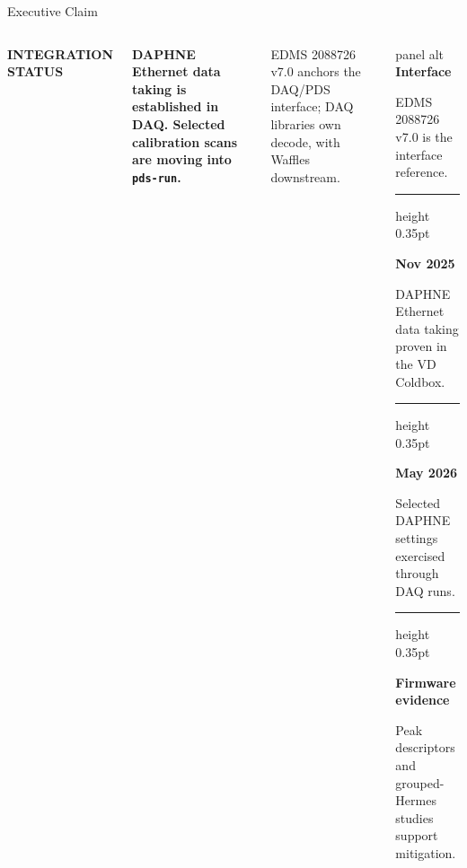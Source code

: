\documentclass[aspectratio=169,10pt]{beamer}
\newcommand{\eyebrow}[1]{{\color{noircyan}\small\bfseries #1\par}}
\newcommand{\blocksep}{%
  \vspace{0.7mm}%
  {\color{noirline}\hrule height 0.35pt}%
  \vspace{0.7mm}%
}
\begin{document}
\begin{frame}[t]{Executive Claim}
\begin{columns}[T,onlytextwidth]
\eyebrow{INTEGRATION STATUS}
{\color{white}\bfseries\fontsize{14}{17}\selectfont
DAPHNE Ethernet data taking is established in DAQ. Selected calibration scans are moving into \texttt{pds-run}. \par}

\vspace{1.5mm}
{\color{noirmuted}\small
EDMS 2088726 v7.0 anchors the DAQ/PDS interface; DAQ libraries own decode, with Waffles downstream. \par}

    \vspace{-1.8cm}
\begin{beamercolorbox}[wd=\linewidth,sep=7pt,rounded=true]{panel alt}
\small
{\color{noircyan}\bfseries Interface}\par
    EDMS 2088726 v7.0 is the interface reference.\par \vspace{2mm}
\blocksep \vspace{2mm}

{\color{noircyan}\bfseries Nov 2025}\par
DAPHNE Ethernet data taking proven in the VD Coldbox.\par \vspace{2mm}
\blocksep \vspace{2mm}

{\color{noircyan}\bfseries May 2026}\par
Selected DAPHNE settings exercised through DAQ runs.\par \vspace{2mm}
\blocksep \vspace{2mm}

{\color{noircyan}\bfseries Firmware evidence}\par
Peak descriptors and grouped-Hermes studies support mitigation.\par
\end{beamercolorbox}
\end{columns}
\end{frame}
\end{document}
